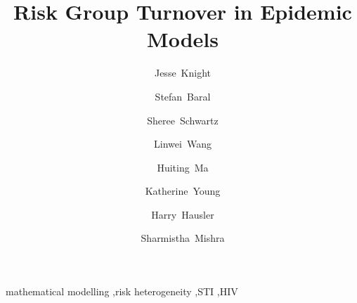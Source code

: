 \begin{frontmatter}
\title{Risk Group Turnover in Epidemic Models}
\author[MAP]{Jesse~Knight}
\author[JHU]{Stefan~Baral}
\author[JHU]{Sheree~Schwartz}
\author[MAP]{Linwei~Wang}
\author[MAP]{Huiting~Ma}
\author[THC]{Katherine~Young}
\author[THC]{Harry~Hausler}
\author[MAP,IDM,IHP,IMS]{Sharmistha~Mishra}
\address[MAP]{MAP Centre for Urban Health Solutions, Unity Health Toronto}
\address[JHU]{Deptartment of Epidemiology, Johns Hopkins Bloomberg School of Public Health}
\address[THC]{TB HIV Care, South Africa}
\address[IDM]{Department of Medicine, Division of Infectious Disease, University of Toronto}
\address[IHP]{Institute of Health Policy, Management and Evaluation,
  Dalla Lana School of Public Health, University of Toronto}
\address[IMS]{Instituof Medical Sciences, University of Toronto}
\begin{abstract}
  
\end{abstract}
\begin{keyword}
  mathematical modelling \sep risk heterogeneity \sep STI \sep HIV
\end{keyword}
\end{frontmatter}
\clearpage
{}
\setcounter{tocdepth}{2}
\tableofcontents
\clearpage
{}
\setcounter{page}{1}

